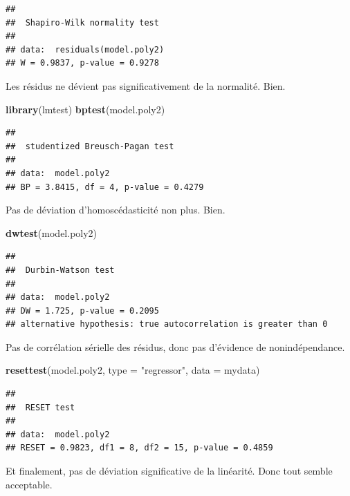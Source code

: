 \documentclass[
  12pt,
]{book}
\newenvironment{Shaded}{\begin{snugshade}}{\end{snugshade}}
\newcommand{\DataTypeTok}[1]{\textcolor[rgb]{0.13,0.29,0.53}{#1}}
\newcommand{\KeywordTok}[1]{\textcolor[rgb]{0.13,0.29,0.53}{\textbf{#1}}}
\newcommand{\NormalTok}[1]{#1}
\newcommand{\StringTok}[1]{\textcolor[rgb]{0.31,0.60,0.02}{#1}}
\begin{document}
\begin{verbatim}
## 
##  Shapiro-Wilk normality test
## 
## data:  residuals(model.poly2)
## W = 0.9837, p-value = 0.9278
\end{verbatim}

Les résidus ne dévient pas significativement de la normalité. Bien.

\begin{Shaded}
\begin{Highlighting}[]
\KeywordTok{library}\NormalTok{(lmtest)}
\KeywordTok{bptest}\NormalTok{(model.poly2)}
\end{Highlighting}
\end{Shaded}

\begin{verbatim}
## 
##  studentized Breusch-Pagan test
## 
## data:  model.poly2
## BP = 3.8415, df = 4, p-value = 0.4279
\end{verbatim}

Pas de déviation d'homoscédasticité non plus. Bien.

\begin{Shaded}
\begin{Highlighting}[]
\KeywordTok{dwtest}\NormalTok{(model.poly2)}
\end{Highlighting}
\end{Shaded}

\begin{verbatim}
## 
##  Durbin-Watson test
## 
## data:  model.poly2
## DW = 1.725, p-value = 0.2095
## alternative hypothesis: true autocorrelation is greater than 0
\end{verbatim}

Pas de corrélation sérielle des résidus, donc pas d'évidence de nonindépendance.

\begin{Shaded}
\begin{Highlighting}[]
\KeywordTok{resettest}\NormalTok{(model.poly2, }\DataTypeTok{type =} \StringTok{"regressor"}\NormalTok{, }\DataTypeTok{data =}\NormalTok{ mydata)}
\end{Highlighting}
\end{Shaded}

\begin{verbatim}
## 
##  RESET test
## 
## data:  model.poly2
## RESET = 0.9823, df1 = 8, df2 = 15, p-value = 0.4859
\end{verbatim}

Et finalement, pas de déviation significative de la linéarité. Donc tout semble acceptable.
\end{document}
